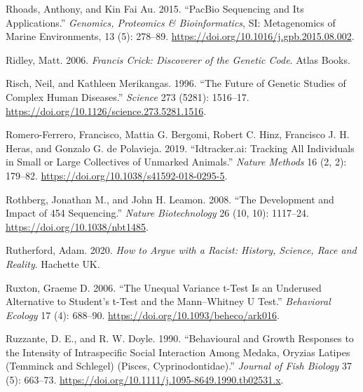 \documentclass[
]{book}
\newlength{\cslhangindent}
\newlength{\cslentryspacingunit} %
\newenvironment{CSLReferences}[2] %
 {%
  \setlength{\parindent}{0pt}
  \ifodd #1
  \let\oldpar\par
  \def\par{\hangindent=\cslhangindent\oldpar}
  \fi
  \setlength{\parskip}{#2\cslentryspacingunit}
 }%
 {}
\begin{document}
\begin{CSLReferences}{1}{0}
\leavevmode{}%
Rhoads, Anthony, and Kin Fai Au. 2015. {``{PacBio Sequencing} and {Its Applications}.''} \emph{Genomics, Proteomics \& Bioinformatics}, {SI}: {Metagenomics} of {Marine Environments}, 13 (5): 278--89. \url{https://doi.org/10.1016/j.gpb.2015.08.002}.

\leavevmode{}%
Ridley, Matt. 2006. \emph{Francis {Crick}: Discoverer of the Genetic Code}. {Atlas Books}.

\leavevmode{}%
Risch, Neil, and Kathleen Merikangas. 1996. {``The {Future} of {Genetic Studies} of {Complex Human Diseases}.''} \emph{Science} 273 (5281): 1516--17. \url{https://doi.org/10.1126/science.273.5281.1516}.

\leavevmode{}%
Romero-Ferrero, Francisco, Mattia G. Bergomi, Robert C. Hinz, Francisco J. H. Heras, and Gonzalo G. de Polavieja. 2019. {``Idtracker.ai: Tracking All Individuals in Small or Large Collectives of Unmarked Animals.''} \emph{Nature Methods} 16 (2, 2): 179--82. \url{https://doi.org/10.1038/s41592-018-0295-5}.

\leavevmode{}%
Rothberg, Jonathan M., and John H. Leamon. 2008. {``The Development and Impact of 454 Sequencing.''} \emph{Nature Biotechnology} 26 (10, 10): 1117--24. \url{https://doi.org/10.1038/nbt1485}.

\leavevmode{}%
Rutherford, Adam. 2020. \emph{How to Argue with a Racist: {History}, Science, Race and Reality}. {Hachette UK}.

\leavevmode{}%
Ruxton, Graeme D. 2006. {``The Unequal Variance t-Test Is an Underused Alternative to {Student}'s t-Test and the {Mann}--{Whitney U} Test.''} \emph{Behavioral Ecology} 17 (4): 688--90. \url{https://doi.org/10.1093/beheco/ark016}.

\leavevmode{}%
Ruzzante, D. E., and R. W. Doyle. 1990. {``Behavioural and Growth Responses to the Intensity of Intraspecific Social Interaction Among Medaka, {Oryzias} Latipes ({Temminck} and {Schlegel}) ({Pisces}, {Cyprinodontidae}).''} \emph{Journal of Fish Biology} 37 (5): 663--73. \url{https://doi.org/10.1111/j.1095-8649.1990.tb02531.x}.


\end{CSLReferences}
\end{document}

